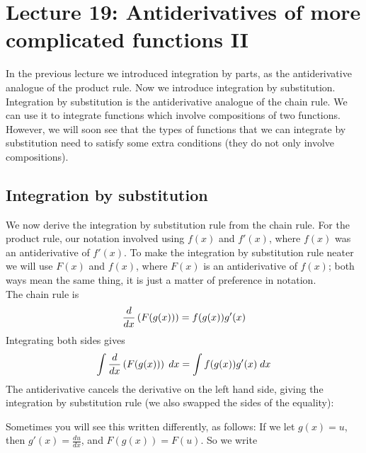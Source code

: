 \chapter{Lecture 19: Antiderivatives of more complicated functions II}
In the previous lecture we introduced integration by parts, as the antiderivative analogue of the product rule. Now we introduce integration by substitution. \\

\noindent Integration by substitution is the antiderivative analogue of the chain rule. We can use it to integrate functions which involve compositions of two functions. However, we will soon see that the types of functions that we can integrate by substitution need to satisfy some extra conditions (they do not only involve compositions).

\section{Integration by substitution} \label{integration by substitution 1}
We now derive the integration by substitution rule from the chain rule. For the product rule, our notation involved using $f(x)$ and $f'(x)$, where $f(x)$ was an antiderivative of $f'(x)$. To make the integration by substitution rule neater we will use $F(x)$ and $f(x)$, where $F(x)$ is an antiderivative of $f(x)$; both ways mean the same thing, it is just a matter of preference in notation. \\

\noindent The chain rule is
\[
\frac{d}{dx}\left(F(g(x))\right) = f(g(x))g'(x)
\]
Integrating both sides gives
\[
\int \frac{d}{dx}\left(F(g(x))\right) \; dx = \int f(g(x))g'(x) \; dx
\]
The antiderivative cancels the derivative on the left hand side, giving the integration by substitution rule (we also swapped the sides of the equality):

  	\bigskip
	
	\hfil{}
	\bigskip

\noindent Sometimes you will see this written differently, as follows: If we let $g(x) = u$, then $g'(x) = \frac{du}{dx}$, and $F(g(x)) = F(u)$. So we write

